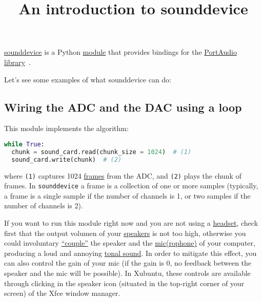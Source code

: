 \title{An introduction to sounddevice}

\maketitle

\href{https://python-sounddevice.readthedocs.io}{sounddevice} is a
Python \href{https://docs.python.org/3/tutorial/modules.html}{module}
that provides bindings for the
\href{http://www.portaudio.com/}{PortAudio
  library}~\cite{sounddevice}.

Let's see some examples of what sounddevice can do:

\subsection*{Wiring the ADC and the DAC using a loop}


This module implements the algorithm:

\begin{lstlisting}[language=Python]
while True:
  chunk = sound_card.read(chunk_size = 1024)  # (1)
  sound_card.write(chunk)  # (2)
\end{lstlisting}
  

where \texttt{(1)} captures 1024
\href{https://python-sounddevice.readthedocs.io/en/0.3.12/api.html}{frames}
from the ADC, and \texttt{(2)} plays the chunk of frames. In
\texttt{sounddevice} a frame is a collection of one or more samples
(typically, a frame is a single sample if the number of channels is 1,
or two samples if the number of channels is 2).

If you want to run this module right now and you are not using a
\href{https://en.wikipedia.org/wiki/Headset_(audio)}{headset}, check
first that the output volumen of your
\href{https://en.wikipedia.org/wiki/Headset_(audio)}{speakers} is not
too high, otherwise you could involuntary
\href{https://www.youtube.com/watch?v=rI90lhYAffo}{``couple''} the
speaker and the
\href{https://en.wikipedia.org/wiki/Microphone}{mic(rophone)} of your
computer, producing a loud and annoying
\href{https://www.cirrusresearch.co.uk/blog/2012/03/tonal-noise-analysis-with-the-optimus-green-sound-level-meters/}{tonal
  sound}. In order to mitigate this effect, you can also control the
gain of your mic (if the gain is 0, no feedback between the speaker
and the mic will be possible). In Xubuntu, these controls are
available through clicking in the speaker icon (situated in the
top-right corner of your screen) of the Xfce window manager.

